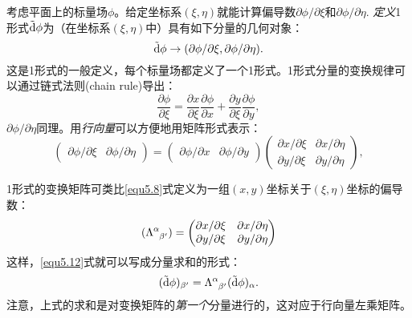 考虑平面上的标量场$\phi$。给定坐标系$(\xi, \eta)$就能计算偏导数$\partial \phi / \partial \xi$和$\partial \phi / \partial \eta$. \textit{定义}1形式$\tilde{\mathrm{d}} \phi$为（在坐标系$(\xi, \eta)$中）具有如下分量的几何对象：
\begin{equation}
    \tilde{\mathrm{d}} \phi \to (\partial \phi / \partial \xi, \partial \phi / \partial \eta).
\label{equ5.10}
\end{equation}
这是1形式的一般定义，每个标量场都定义了一个1形式。1形式分量的变换规律可以通过链式法则(chain rule)导出：
\begin{equation}
    \frac{\partial \phi}{\partial \xi} = \frac{\partial x}{\partial \xi} \frac{\partial \phi}{\partial x} + \frac{\partial y}{\partial \xi} \frac{\partial \phi}{\partial y},
\label{equ5.11}
\end{equation}
$\partial \phi / \partial \eta$同理。用\textit{行向量}可以方便地用矩阵形式表示：
\begin{equation}
\begin{pmatrix}
    \partial \phi / \partial \xi & \partial \phi / \partial \eta
\end{pmatrix}
=
\begin{pmatrix}
    \partial \phi / \partial x & \partial \phi / \partial y
\end{pmatrix}
\begin{pmatrix}
    \partial x / \partial \xi & \partial x / \partial \eta \\
    \partial y / \partial \xi & \partial y / \partial \eta
\end{pmatrix},
\label{equ5.12}
\end{equation}

1形式的变换矩阵可类比\eqref{equ5.8}式定义为一组$(x, y)$坐标关于$(\xi, \eta)$坐标的偏导数：
\begin{equation}
    ( \Lambda\indices{^\alpha_{\beta'}} ) = 
    \begin{pmatrix}
        \partial x / \partial \xi & \partial x / \partial \eta \\
        \partial y / \partial \xi & \partial y / \partial \eta
    \end{pmatrix}
\label{equ5.13}
\end{equation}
这样，\eqref{equ5.12}式就可以写成分量求和的形式：
\begin{equation}
    (\trd \phi)_{\beta'} = \Lambda\indices{^\alpha_{\beta'}} (\trd \phi)_\alpha.
\label{equ5.14}
\end{equation}
注意，上式的求和是对变换矩阵的\textit{第一个}分量进行的，这对应于行向量左乘矩阵。


